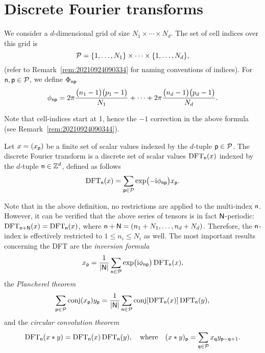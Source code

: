 \section{Discrete Fourier transforms}
\label{sec:20210924084718}

We consider a \(d\)-dimensional grid of size \(N_1\times\cdots\times N_d\). The
set of cell indices over this grid is
\begin{equation}
\mathcal{P}=\{1,\ldots, N_1\}\times\cdots\times\{1, \ldots, N_d\},
\end{equation}
(refer to Remark~\ref{rem:20210924090334} for naming conventions of
indices). For \(\mathsf{n}, \mathsf{p}\in\mathcal{P}\), we define
\(\Phi_{\mathsf{n}\mathsf{p}}\)
\begin{equation}
\phi_{\mathsf{n}\mathsf{p}}=2\pi\frac{\bigl(n_1-1\bigr)\bigl(p_1-1\bigr)}{N_1}
+\cdots+2\pi\frac{\bigl(n_d-1\bigr)\bigl(p_d-1\bigr)}{N_d}.
\end{equation}

Note that cell-indices start at 1, hence the \(-1\) correction in the above
formula (see Remark~\ref{rem:20210924090344}).

Let \(x=(x_{\mathsf{p}})\) be a finite set of scalar values indexed by the
\(d\)-tuple \(\mathsf{p}\in\mathcal{P}\). The discrete Fourier transform is a
discrete set of scalar values \(\operatorname{DFT}_{\mathsf{n}}(x)\) indexed by the \(d\)-tuple
\(\mathsf{n}\in\mathbb Z^d\), defined as follows
\begin{equation}
\operatorname{DFT}_{\mathsf{n}}(x)=\sum_{\mathsf{p}\in\mathcal{P}}
\exp\bigl(-\mathrm i\phi_{\mathsf{n}\mathsf{p}}\bigr)x_{\mathsf{p}}.
\end{equation}

Note that in the above definition, no restrictions are applied to the
multi-index \(\mathsf{n}\). However, it can be verified that the above series of
tensors is in fact \(\mathsf{N}\)-periodic:
\(\operatorname{DFT}_{\mathsf{n}+\mathsf{N}}(x)=\operatorname{DFT}_{\mathsf{n}}(x)\), where
\(\mathsf{n}+\mathsf{N}=(n_1+N_1, \ldots, n_d+N_d)\). Therefore, the
\(\mathsf{n}\)-index is effectively restricted to \(1\leq n_i\leq N_i\) as
well. The most important results concerning the DFT are the \emph{inversion
  formula}
\begin{equation}
x_{\mathsf{p}}=\frac1{\lvert\mathsf{N}\rvert}\sum_{\mathsf{n}\in\mathcal{P}}
\exp\bigl(\mathrm i\phi_{\mathsf{n}\mathsf{p}}\bigr)\operatorname{DFT}_{\mathsf{n}}(x),
\end{equation}
the \emph{Plancherel theorem}
\begin{equation}
\sum_{\mathsf{p}\in\mathcal{P}}\operatorname{conj}(x_{\mathsf p})y_{\mathsf p}
=\frac1{\lvert\mathsf N\rvert}\sum_{\mathsf{n}\in\mathcal{P}}
\operatorname{conj}[\operatorname{DFT}_{\mathsf n}(x)]\operatorname{DFT}_{\mathsf n}(y),
\end{equation}
and the \emph{circular convolution theorem}
\begin{equation}
\operatorname{DFT}_{\mathsf{n}}(x\ast y)=\operatorname{DFT}_{\mathsf{n}}(x)\operatorname{DFT}_{\mathsf{n}}(y),
\quad\text{where}\quad
(x\ast y)_{\mathsf p}=\sum_{\mathsf{q}\in\mathcal{P}}
x_{\mathsf{q}}y_{\mathsf{p}-\mathsf{q}+1}.
\end{equation}

